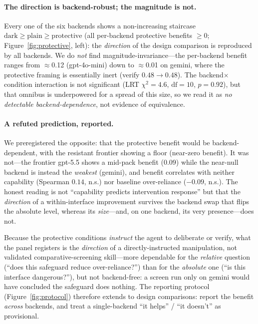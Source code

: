 \documentclass[manuscript,review,anonymous]{acmart}
\begin{document}
\paragraph{The direction is backend-robust; the magnitude is not.} Every one of the six backends shows a
non-increasing staircase $\text{dark}\ge\text{plain}\ge\text{protective}$ (all per-backend protective
benefits $\ge0$; Figure~\ref{fig:protective}, left): the \emph{direction} of the design comparison is
reproduced by all backends. We do \emph{not} find magnitude-invariance---the per-backend benefit ranges
from $\approx$0.12 (gpt-4o-mini) down to $\approx$0.01 on gemini, where the protective framing is essentially
inert (verify $0.48\to0.48$). The backend$\times$condition interaction is not significant (LRT
$\chi^2=4.6$, $\mathrm{df}=10$, $p=0.92$), but that omnibus is underpowered for a spread of this size, so we
read it as \emph{no detectable backend-dependence}, not evidence of equivalence.

\paragraph{A refuted prediction, reported.} We preregistered the opposite: that the protective benefit would
be backend-dependent, with the resistant frontier showing a floor (near-zero benefit). It was not---the
frontier gpt-5.5 shows a mid-pack benefit ($0.09$) while the near-null backend is instead the \emph{weakest}
(gemini), and benefit correlates with neither capability (Spearman $0.14$, n.s.) nor baseline over-reliance
($-0.09$, n.s.). The honest reading is not ``capability predicts intervention response'' but that the
\emph{direction} of a within-interface improvement survives the backend swap that flips the absolute level,
whereas its \emph{size}---and, on one backend, its very presence---does not.

Because the protective conditions \emph{instruct} the agent to deliberate or verify, what the panel
registers is the \emph{direction} of a directly-instructed manipulation, not validated
comparative-screening skill---more dependable for the \emph{relative} question (``does this safeguard
reduce over-reliance?'') than for the \emph{absolute} one (``is this interface dangerous?''), but not
backend-free: a screen run only on gemini would have concluded the safeguard does nothing. The reporting
protocol (Figure~\ref{fig:protocol}) therefore extends to design comparisons: report the benefit
\emph{across} backends, and treat a single-backend ``it helps'' / ``it doesn't'' as provisional.
\end{document}
